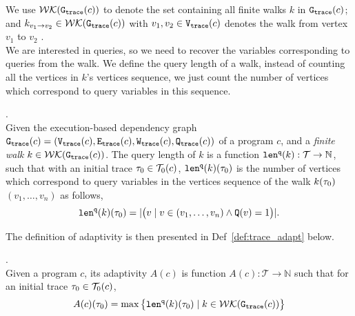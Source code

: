 We use $\mathcal{WK}(\mathtt{{G_{trace}}}(c))$ to denote 
the set containing all finite walks $k$ in $\mathtt{{G_{trace}}}(c)$;
and $k_{v_1 \to v_2} \in \mathcal{WK}(\mathtt{{G_{trace}}}(c))$ with $v_1, v_2 \in \mathtt{{V_{trace}}}(c)$ denotes the walk from vertex $v_1$ to $v_2$ . 
\\
We are interested in queries, so we need to recover the 
variables corresponding to queries from the walk. We define the query length of a walk, 
instead of counting all 
the vertices in $k$'s vertices sequence, we just count the number of vertices which correspond to query variables in this sequence.
%
\begin{defn}.
\label{def:qlen}
\\
Given 
the execution-based dependency graph $\mathtt{{G_{trace}}}({c}) = (\mathtt{{V_{trace}}}({c}), \mathtt{{E_{trace}}}({c}), \mathtt{{W_{trace}}}({c}), \mathtt{{Q_{trace}}}({c}))$ of a program $c$,
 and a \emph{finite walk} 
 $k \in \mathcal{WK}(\mathtt{{G_{trace}}}(c))$. 
The query length of $k$ is a function $\mathtt{len}^{\tt q}(k): \mathcal{T} \to \mathbb{N}$, such that with an initial trace  $\mathtt{\tau}_0 \in \mathcal{T}_0(c)$, $\mathtt{len}^{\tt q}(k)(\mathtt{\tau}_0)$ is
the number of vertices which correspond to query variables in the vertices sequence of the walk $k(\mathtt{\tau}_0)$
$(v_1, \ldots, v_{n})$ as follows, 
\[
  \mathtt{len}^{\tt q}(k)(\mathtt{\tau}_0) = |\big( v \mid v \in (v_1, \ldots, v_{n}) \land \mathtt{Q}(v) = 1 \big)|.
\]
\end{defn}
The definition of adaptivity is then presented in Def~\ref{def:trace_adapt} below.

\begin{defn}
  .
  \label{def:trace_adapt}
  \\
  Given a program ${c}$, 
  its adaptivity $A(c)$ is function 
  $A(c) : \mathcal{T} \to \mathbb{N}$ such that for an
  initial trace $\mathtt{\tau}_0 \in \mathcal{T}_0(c)$, 
 $$
  A(c)(\mathtt{\tau}_0) = \max \big 
  \{ \mathtt{len}^{\tt q}(k)(\mathtt{\tau}_0) \mid k \in \mathcal{WK}(\mathtt{{G_{trace}}}(c)) \big \} $$
  \end{defn}
